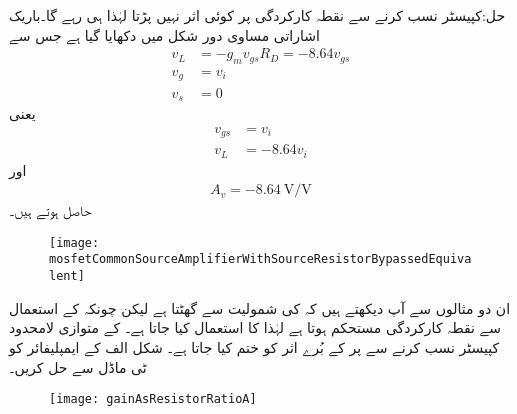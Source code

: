 حل:کپیسٹر نسب کرنے سے نقطہ کارکردگی پر کوئی اثر نہیں پڑتا لہٰذا  ہی رہے گا۔باریک اشاراتی مساوی دور شکل  میں دکھایا گیا ہے جس سے
\begin{align*}
v_L&=-g_m v_{gs} R_D=-8.64 v_{gs}\\
v_g&=v_i\\
v_s&=0
\end{align*}
یعنی
\begin{align*}
v_{gs}&=v_i\\
v_L&=-8.64 v_i
\end{align*}
اور 
\begin{align*}
A_v=\SI{-8.64}{\volt \per \volt}
\end{align*}
حاصل ہوتے ہیں۔
%
\begin{figure}
\centering
\texttt{[image: mosfetCommonSourceAmplifierWithSourceResistorBypassedEquivalent]}
\caption{}
\label{شکل_ماسفیٹ_مخارج_مزاحمت_کے_متوازی_کپیسٹر_مساوی}
\end{figure}
ان دو مثالوں سے آپ دیکھتے ہیں کہ  کی شمولیت سے  گھٹتا ہے لیکن چونکہ  کے استعمال سے نقطہ کارکردگی مستحکم ہوتا ہے لہٰذا  کا استعمال کیا جاتا ہے۔ کے متوازی لامحدود کپیسٹر نسب کرنے سے  پر  کے بُرے اثر کو ختم کیا جاتا ہے۔
شکل  الف کے ایمپلیفائر کو ٹی ماڈل سے حل کریں۔ 
\begin{figure}
\centering
\texttt{[image: gainAsResistorRatioA]}
\caption{}
\label{شکل_ماسفیٹ_افزائش_بطور_کسر_مزاحمت_الف}
\end{figure}

